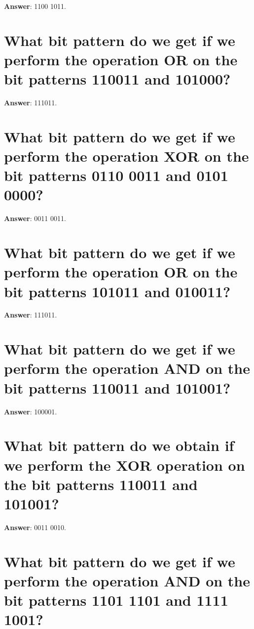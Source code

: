\documentclass[a4paper,11pt,oneside]{book}
\begin{document}
\begin{sloppypar}
\textbf{Answer}: 1100 1011.



\section{What bit pattern do we get if we perform the operation OR on the bit patterns 110011 and 101000?}

\label{q:412:sa:en:True}

\textbf{Answer}: 111011.



\section{What bit pattern do we get if we perform the operation XOR on the bit patterns 0110 0011 and 0101 0000?}

\label{q:413:sa:en:True}

\textbf{Answer}: 0011 0011.



\section{What bit pattern do we get if we perform the operation OR on the bit patterns 101011 and 010011?}

\label{q:414:sa:en:True}

\textbf{Answer}: 111011.



\section{What bit pattern do we get if we perform the operation AND on the bit patterns 110011 and 101001?}

\label{q:415:sa:en:True}

\textbf{Answer}: 100001.



\section{What bit pattern do we obtain if we perform the XOR operation on the bit patterns 110011 and 101001?}

\label{q:416:sa:en:True}

\textbf{Answer}: 0011 0010.



\section{What bit pattern do we get if we perform the operation AND on the bit patterns 1101 1101 and 1111 1001?}


\end{sloppypar}
\end{document}
